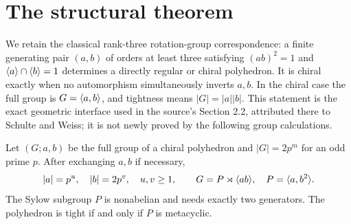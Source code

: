 \section{The structural theorem}
We retain the classical rank-three rotation-group correspondence:
a finite generating pair $(a,b)$ of orders at least three satisfying
$(ab)^2=1$ and $\langle a\rangle\cap\langle b\rangle=1$ determines a directly regular
or chiral polyhedron. It is chiral exactly when no automorphism
simultaneously inverts $a,b$. In the chiral case the full group is
$G=\langle a,b\rangle$, and tightness means $|G|=|a||b|$.
This statement is the exact geometric interface used in the source's
Section 2.2, attributed there to Schulte and Weiss; it is not newly
proved by the following group calculations.

\begin{theorem}
Let $(G;a,b)$ be the full group of a chiral polyhedron and
$|G|=2p^m$ for an odd prime $p$. After exchanging $a,b$ if necessary,
\[
|a|=p^u,\quad |b|=2p^v,\quad u,v\geq1,
\qquad G=P\rtimes\langle ab\rangle,\quad P=\langle a,b^2\rangle.
\]
The Sylow subgroup $P$ is nonabelian and needs exactly two generators.
The polyhedron is tight if and only if $P$ is metacyclic.
\end{theorem}
